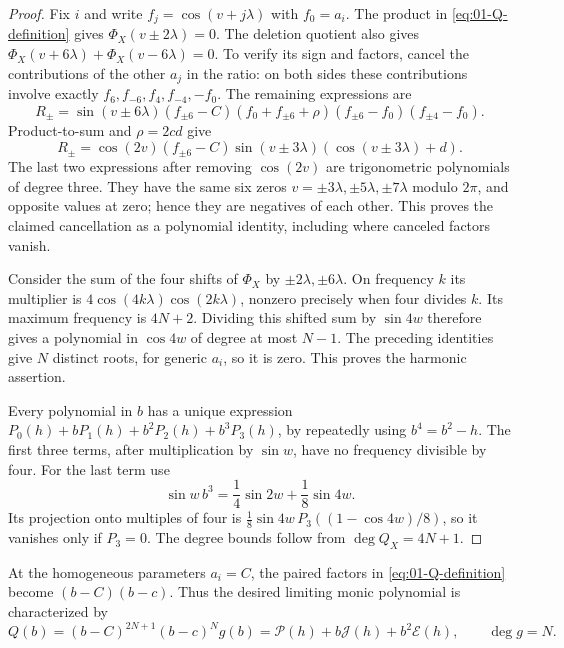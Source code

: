 \begin{proof}
Fix $i$ and write $f_j=\cos(v+j\lambda)$ with $f_0=a_i$.
The product in \eqref{eq:01-Q-definition} gives
$\Phi_X(v\pm2\lambda)=0$. The deletion quotient also gives
$\Phi_X(v+6\lambda)+\Phi_X(v-6\lambda)=0$. To verify its sign and
factors, cancel the contributions of the other $a_j$ in the ratio:
on both sides these contributions involve exactly
$f_6,f_{-6},f_4,f_{-4},-f_0$. The remaining expressions are
\[
 R_\pm=\sin(v\pm6\lambda)(f_{\pm6}-C)
       (f_0+f_{\pm6}+\rho)(f_{\pm6}-f_0)(f_{\pm4}-f_0).
\]
Product-to-sum and $\rho=2cd$ give
\[
 R_\pm=\cos(2v)(f_{\pm6}-C)
             \sin(v\pm3\lambda)(\cos(v\pm3\lambda)+d).
\]
The last two expressions after removing $\cos(2v)$ are trigonometric
polynomials of degree three. They have the same six zeros
$v=\pm3\lambda,\pm5\lambda,\pm7\lambda$ modulo $2\pi$, and
opposite values at zero; hence they are negatives of each other.
This proves the claimed cancellation as a polynomial identity,
including where canceled factors vanish.

Consider the sum of the four shifts of $\Phi_X$ by
$\pm2\lambda,\pm6\lambda$. On frequency $k$ its multiplier is
$4\cos(4k\lambda)\cos(2k\lambda)$, nonzero precisely when four divides
$k$. Its maximum frequency is $4N+2$. Dividing this shifted sum by
$\sin4w$ therefore gives a polynomial in $\cos4w$ of degree at most
$N-1$. The preceding identities give $N$ distinct roots, for generic
$a_i$, so it is zero. This proves the harmonic assertion.

Every polynomial in $b$ has a unique expression
$P_0(h)+bP_1(h)+b^2P_2(h)+b^3P_3(h)$, by repeatedly using
$b^4=b^2-h$. The first three terms, after multiplication by $\sin w$,
have no frequency divisible by four. For the last term use
\[
 \sin w\,b^3=\frac14\sin2w+\frac18\sin4w.
\]
Its projection onto multiples of four is
$\frac18\sin4w\,P_3((1-\cos4w)/8)$, so it vanishes only if $P_3=0$.
The degree bounds follow from $\deg Q_X=4N+1$.
\end{proof}

At the homogeneous parameters $a_i=C$, the paired factors in
\eqref{eq:01-Q-definition} become $(b-C)(b-c)$. Thus the desired
limiting monic polynomial is characterized by
\begin{equation}\label{eq:01-homogeneous-projection}
 Q(b)=(b-C)^{2N+1}(b-c)^N g(b)
     =\mathcal P(h)+b\mathcal J(h)+b^2\mathcal E(h),
 \qquad \deg g=N.
\end{equation}

